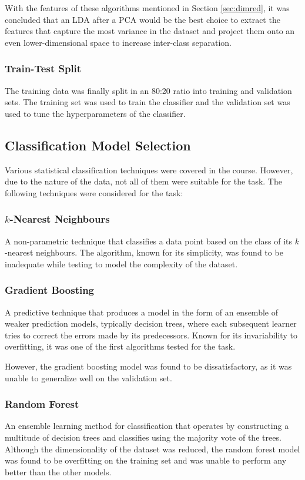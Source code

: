 \documentclass[conference]{IEEEtran}
\begin{document}
    With the features of these algorithms mentioned in Section \ref{sec:dimred}, it was concluded that an LDA after a PCA would be the best choice
    to extract the features that capture the most variance in the dataset and project them onto an even lower-dimensional space to increase inter-class separation.

    \subsubsection{Train-Test Split}
    The training data was finally split in an 80:20 ratio into training and validation sets.
    The training set was used to train the classifier and the validation set was used to tune the hyperparameters of the classifier.

    \subsection{Classification Model Selection}
    \label{sec:modelselection}
    Various statistical classification techniques were covered in the course.
    However, due to the nature of the data, not all of them were suitable for the task.
    The following techniques were considered for the task:

    \subsubsection{$k$-Nearest Neighbours}
    \label{sec:knn}
    A non-parametric technique that classifies a data point based on the class of its $k$-nearest neighbours.
    The algorithm, known for its simplicity, was found to be inadequate while testing to model the complexity of the dataset.

    \subsubsection{Gradient Boosting}
    \label{sec:gb}
    A predictive technique that produces a model in the form of an ensemble of weaker prediction models, typically decision trees,
    where each subsequent learner tries to correct the errors made by its predecessors.
    Known for its invariability to overfitting, it was one of the first algorithms tested for the task.

    However, the gradient boosting model was found to be dissatisfactory, as it was unable to generalize well on the validation set.

    \subsubsection{Random Forest}
    \label{sec:rf}
    An ensemble learning method for classification that operates by constructing a multitude of decision trees and classifies using the majority vote of the trees.
    Although the dimensionality of the dataset was reduced, the random forest model was found to be overfitting on the training set
    and was unable to perform any better than the other models.
\end{document}
